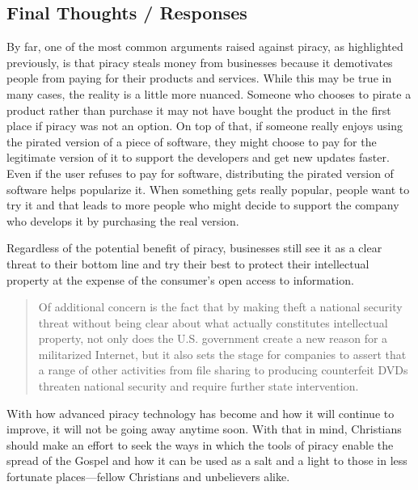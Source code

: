\documentclass[onecolumn, 12pt]{article}
\begin{document}
\begin{refsection}
\subsection{Final Thoughts / Responses}
By far, one of the most common arguments raised against piracy, as highlighted previously,
is that piracy steals money from businesses because it demotivates people from paying for
their products and services. While this may be true in many cases, the reality is a little
more nuanced. Someone who chooses to pirate a product rather than purchase it may not have
bought the product in the first place if piracy was not an option. On top of that, if
someone really enjoys using the pirated version of a piece of software, they might choose
to pay for the legitimate version of it to support the developers and get new updates
faster. Even if the user refuses to pay for software, distributing the pirated version of
software helps popularize it. When something gets really popular, people want to try it
and that leads to more people who might decide to support the company who develops it by
purchasing the real version.

Regardless of the potential benefit of piracy, businesses still see it as a clear threat
to their bottom line and try their best to protect their intellectual property at the
expense of the consumer's open access to information. \blockcquote[264]{halbert:agendas}
{Of additional concern is the fact that by making  theft a
national security threat without being clear about what actually constitutes intellectual
property, not only does the U.S. government create a new reason for a militarized
Internet, but it also sets the stage for companies to assert that a range of other
activities from file sharing to producing counterfeit DVDs threaten national security and
require further state intervention.}

With how advanced piracy technology has become and how it will continue to improve, it
will not be going away anytime soon. With that in mind, Christians should make an effort
to seek the ways in which the tools of piracy enable the spread of the Gospel and how it
can be used as a salt and a light to those in less fortunate places---fellow Christians
and unbelievers alike.

\clearpage
\printbibliography[title=References]
\end{refsection}

\clearpage
\nocite{*}
\printbibliography[title=Bibliography]
\end{document}
